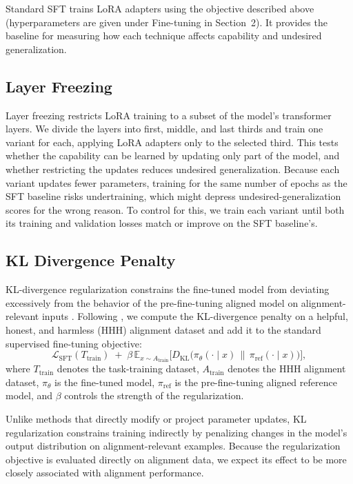 \documentclass[11pt]{article}
\begin{document}
Standard SFT trains LoRA adapters using the objective described above (hyperparameters are given
under Fine-tuning in Section~2). It provides the baseline for measuring how each technique
affects capability and undesired generalization.

\subsection{Layer Freezing}

Layer freezing restricts LoRA training to a subset of the model's transformer layers. We divide
the layers into first, middle, and last thirds and train one variant for each, applying LoRA
adapters only to the selected third. This tests whether the capability can be learned by
updating only part of the model, and whether restricting the updates reduces undesired
generalization. Because each variant updates fewer parameters, training for the same number of
epochs as the SFT baseline risks undertraining, which might depress undesired-generalization
scores for the wrong reason. To control for this, we train each variant until both its training
and validation losses match or improve on the SFT baseline's.

\subsection{KL Divergence Penalty}

KL-divergence regularization constrains the fine-tuned model from deviating excessively from the
behavior of the pre-fine-tuning aligned model on alignment-relevant inputs
\citep{azarbal2025selective}. Following \citet{azarbal2025selective}, we compute the
KL-divergence penalty on a helpful, honest, and harmless (HHH) alignment dataset and add it to
the standard supervised fine-tuning objective:
\begin{equation}
\mathcal{L}_{\mathrm{SFT}}(T_{\mathrm{train}})
\;+\;
\beta \, \mathbb{E}_{x \sim A_{\mathrm{train}}}
\Big[ D_{\mathrm{KL}}\big( \pi_{\theta}(\cdot \mid x) \,\|\, \pi_{\mathrm{ref}}(\cdot \mid x) \big) \Big],
\end{equation}
where $T_{\mathrm{train}}$ denotes the task-training dataset, $A_{\mathrm{train}}$ denotes the
HHH alignment dataset, $\pi_{\theta}$ is the fine-tuned model, $\pi_{\mathrm{ref}}$ is the
pre-fine-tuning aligned reference model, and $\beta$ controls the strength of the
regularization.

Unlike methods that directly modify or project parameter updates, KL regularization constrains
training indirectly by penalizing changes in the model's output distribution on
alignment-relevant examples. Because the regularization objective is evaluated directly on
alignment data, we expect its effect to be more closely associated with alignment performance.
\end{document}

